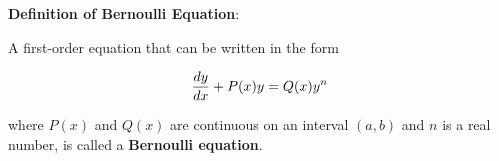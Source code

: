 \nopagenumbers
{\bf Definition of Bernoulli Equation}: 

\vskip 6pt
A first-order equation that can be written in the form

$${dy\over dx}+P(x)y=Q(x)y^n$$

where $P(x)$ and $Q(x)$ are continuous on an interval $(a,b)$ and $n$ is a real number, is called a {\bf Bernoulli equation}.

\vfill\eject
\bye
